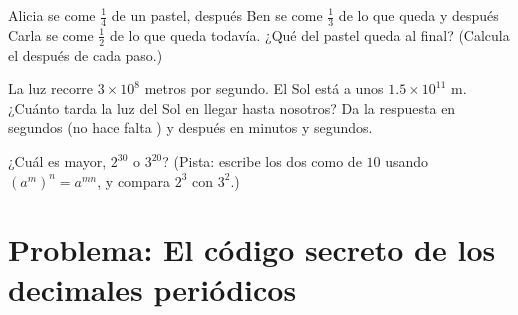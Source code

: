\begin{exercise}[$\star\star$]\label{exo:g9:fractions:8}
Alicia se come $\frac14$ de un pastel, después Ben se come $\frac13$ de lo que queda
y después Carla se come $\frac12$ de lo que queda todavía. ¿Qué  del
pastel queda al final? (Calcula el  después de cada paso.)
\end{exercise}

\begin{exercise}[$\star\star$]\label{exo:g9:fractions:9}
La luz recorre $3 \times 10^8$ metros por segundo. El Sol está a unos
$1.5 \times 10^{11}$ m. ¿Cuánto tarda la luz del Sol en llegar hasta nosotros?
Da la respuesta en segundos (no hace falta ) y después en
minutos y segundos.
\end{exercise}

\begin{exercise}[$\star\star\star$]\label{exo:g9:fractions:10}
¿Cuál es mayor, $2^{30}$ o $3^{20}$? (Pista: escribe los dos como  de
 $10$ usando $\left(a^m\right)^n = a^{mn}$, y compara $2^3$ con
$3^2$.)
\end{exercise}

\section{Problema: El código secreto de los decimales periódicos}

